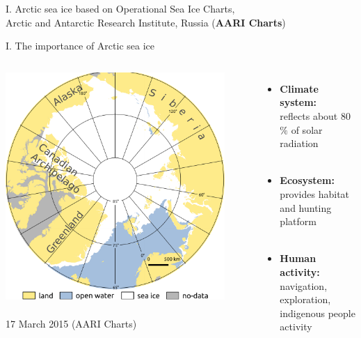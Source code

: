 \documentclass[8pt]{beamer}
\newcommand\Fontvi{\fontsize{6}{7.2}\selectfont}
\begin{document}
\begin{frame}[fragile]{I. Arctic sea ice}
based on Operational Sea Ice Charts,\\
Arctic and Antarctic Research Institute, Russia (\textbf{AARI Charts})	
\end{frame}
	
\setwatermark{\fontsize{125pt}{125pt}\selectfont{}}
\begin{frame}[fragile]{I. The importance of Arctic sea ice}
	\begin{columns}
			\includegraphics[width=0.9\textwidth]{./img/ArcticSI_Mar2015_SI_names.pdf}\\~\\

		17 March 2015 (AARI Charts)
	\begin{itemize}
		\item \textbf{Climate system:}\\ reflects about 80$\%$ of solar radiation\\~\\
		\item \textbf{Ecosystem:}\\ provides habitat and hunting platform\\~\\
		\item \textbf{Human activity:}\\ navigation, exploration, indigenous people activity
	\end{itemize}
	\end{columns}
\end{frame}
\end{document}
